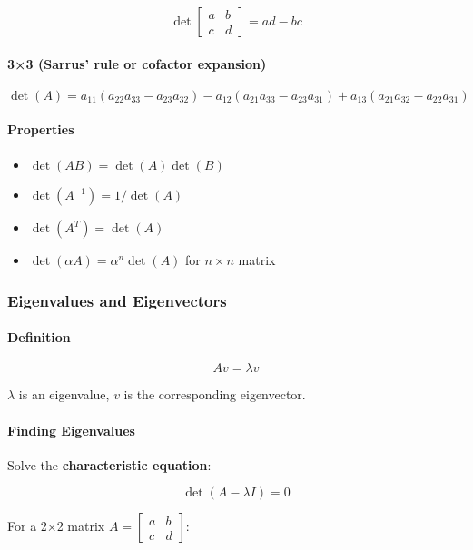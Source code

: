\documentclass[11pt,a4paper]{book}
\begin{document}
\[\det\begin{bmatrix} a & b \\ c & d \end{bmatrix} = ad - bc\]

\paragraph{3×3 (Sarrus' rule or cofactor expansion)}

\[\det(A) = a_{11}(a_{22}a_{33} - a_{23}a_{32}) - a_{12}(a_{21}a_{33} - a_{23}a_{31}) + a_{13}(a_{21}a_{32} - a_{22}a_{31})\]

\paragraph{Properties}

\begin{itemize}
\item $\det(AB) = \det(A)\det(B)$
\item $\det(A^{-1}) = 1/\det(A)$
\item $\det(A^T) = \det(A)$
\item $\det(\alpha A) = \alpha^n \det(A)$ for $n \times n$ matrix
\end{itemize}

\medskip\noindent\hrulefill\medskip

\subsubsection{Eigenvalues and Eigenvectors}

\paragraph{Definition}

\[Av = \lambda v\]

$\lambda$ is an eigenvalue, $v$ is the corresponding eigenvector.

\paragraph{Finding Eigenvalues}

Solve the \textbf{characteristic equation}:

\[\det(A - \lambda I) = 0\]

For a 2×2 matrix $A = \begin{bmatrix} a & b \\ c & d \end{bmatrix}$:
\end{document}

